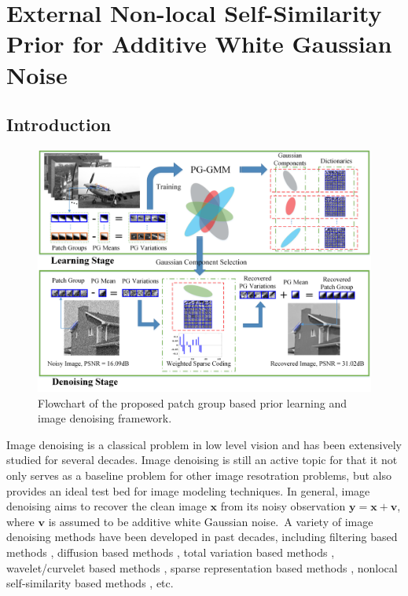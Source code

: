%
\chapter{External Non-local Self-Similarity Prior for Additive White Gaussian Noise}
\label{sec:external}


\section{Introduction}
\begin{figure}
\centering
\includegraphics[width=0.74\linewidth]{images/pgpd/flowchart2.png}
\caption{Flowchart of the proposed patch group based prior learning and image denoising framework.}
\label{fig2-1}
\end{figure}

Image denoising is a classical problem in low level vision and has been extensively studied for several decades. Image denoising is still an active topic for that it not only serves as a baseline problem for other image resotration problems, but also provides an ideal test bed for image modeling techniques. In general, image denoising aims to recover the clean image $\bm{x}$ from its noisy observation $\bm{y} = \bm{x} + \bm{v}$, where $\bm{v}$ is assumed to be additive white Gaussian noise.\ A variety of image denoising methods have been developed in past decades, including filtering based methods \cite{Tomasi1998}, diffusion based methods \cite{PeronaMalik1990}, total variation based methods \cite{rudin1992nonlinear,osher2005iterative}, wavelet/curvelet based methods \cite{softthresholding,bayesshrink,curvelet}, sparse representation based methods \cite{ksvd,lssc,ncsr}, nonlocal self-similarity based methods \cite{nlm,bm3d,nnm,wnnm}, etc.

